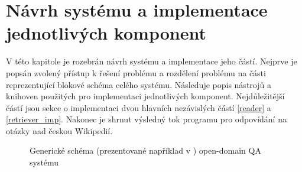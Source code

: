
\chapter{Návrh systému a implementace jednotlivých komponent}
\label{design_and_implementation}
V této kapitole je rozebrán návrh systému a implementace jeho částí. Nejprve je popsán zvolený přístup k řešení problému a rozdělení problému na části reprezentující blokové schéma celého systému. Následuje popis nástrojů a knihoven použitých pro implementaci jednotlivých komponent. Nejdůležitější částí jsou sekce o implementaci dvou hlavních nezávislých částí \ref{reader} a \ref{retriever_imp}. Nakonec je shrnut výsledný tok programu pro odpovídání na otázky nad českou Wikipedií.

\begin{figure}[hbt]
	\centering
	\caption{Generické schéma (prezentované například v \cite{drQA}) open-domain QA systému}
	\label{qa_scheme}
\end{figure}

